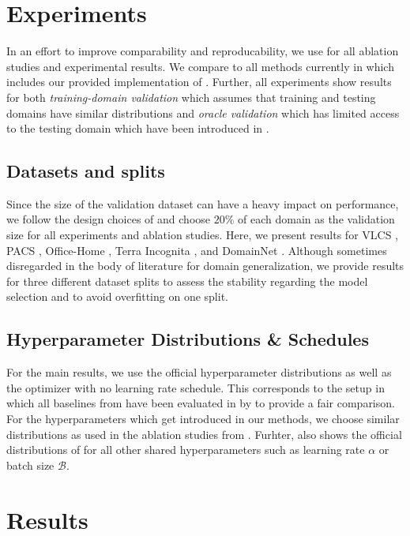 \section{Experiments}
In an effort to improve comparability and reproducability, we use \domainbed \citep{gulrajani2020search} for all ablation studies and experimental results. We compare to all methods currently in \domainbed which includes our provided implementation of \rsc. Further, all experiments show results for both \emph{training-domain validation} which assumes that training and testing domains have similar distributions  and \emph{oracle validation} which has limited access to the testing domain which have been introduced in .

\subsection{Datasets and splits}
Since the size of the validation dataset can have a heavy impact on performance, we follow the design choices of \domainbed and choose $20\%$ of each domain as the validation size for all experiments and ablation studies. Here, we present results for VLCS \citep{FangXR13}, PACS \citep{LiYSH17}, Office-Home \citep{VenkateswaraECP17}, Terra Incognita \citep{BeeryHP18}, and DomainNet \citep{PengBXHSW19}. Although sometimes disregarded in the body of literature for domain generalization, we provide results for three different dataset splits to assess the stability regarding the model selection and to avoid overfitting on one split. 

\subsection{Hyperparameter Distributions \& Schedules}
For the main results, we use the official \domainbed hyperparameter distributions as well as the \adam optimizer with no learning rate schedule. This corresponds to the setup in which all baselines from  have been evaluated in by \citet{gulrajani2020search} to provide a fair comparison. For the hyperparameters which get introduced in our methods, we choose similar distributions as used in the ablation studies from . Furhter,  also shows the official distributions of \domainbed for all other shared hyperparameters such as learning rate $\alpha$ or batch size $\mathcal{B}$.


\section{Results}

